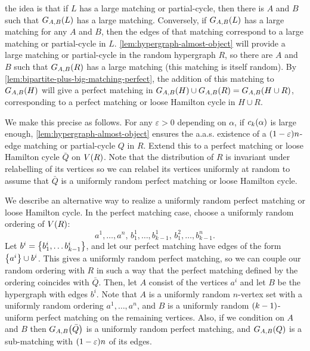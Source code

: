 \documentclass[11pt,english]{article}
\theoremstyle{plain}
\theoremstyle{definition}
\theoremstyle{definition}
\theoremstyle{plain}
\theoremstyle{plain}
\theoremstyle{plain}
\theoremstyle{plain}
\theoremstyle{remark}
\theoremstyle{remark}
\let\originalleft\left
\let\originalright\right
\renewcommand{\left}{\mathopen{}\mathclose\bgroup\originalleft}
\renewcommand{\right}{\aftergroup\egroup\originalright}
\begin{document}
the idea is that if $L$ has a large matching or partial-cycle, then there
is $A$ and $B$ such that $G_{A,B}\left(L\right)$ has a large matching. Conversely,
if $G_{A,B}\left(L\right)$ has a large matching for any $A$
and $B$, then the edges of that matching correspond to a large matching or partial-cycle in $L$. \ref{lem:hypergraph-almost-object}
will provide a large matching or partial-cycle in the random hypergraph $R$, so there are $A$
and $B$ such that $G_{A,B}\left(R\right)$ has a large matching (this matching is itself random).
By \ref{lem:bipartite-plus-big-matching-perfect}, the addition of
this matching to $G_{A,B}\left(H\right)$ will give a perfect
matching in $G_{A,B}\left(H\right)\cup G_{A,B}\left(R\right)=G_{A,B}\left(H\cup R\right)$,
corresponding to a perfect matching or loose Hamilton cycle in $H\cup R$.

We make this precise as follows. For any $\varepsilon>0$ depending on $\alpha$, if $\chyp\left(\alpha\right)$
is large enough, \ref{lem:hypergraph-almost-object} ensures the a.a.s.
existence of a $\left(1-\varepsilon\right)n$-edge matching or partial-cycle $Q$ in $R$. Extend this to a perfect matching or loose Hamilton cycle
$\bar{Q}$ on $V\left(R\right)$. Note that the distribution of $R$
is invariant under relabelling of its vertices so we can relabel its
vertices uniformly at random to assume that $\bar{Q}$ is a uniformly
random perfect matching or loose Hamilton cycle.

We describe an alternative way to realize a uniformly random perfect
matching or loose Hamilton cycle. In the perfect matching case, choose a
uniformly random ordering of $V\left(R\right)$: 
\[
a^{1},\dots,a^{n},\, b_{1}^{1},\dots,b_{k-1}^{1},\, b_{1}^{2},\dots,b_{k-1}^{n}.
\]
Let $b^{i}=\left\{ b_{1}^{i},\dots b_{k-1}^{i}\right\}$, and let our perfect matching have edges of the form $\left\{a^{i}\right\}\cup b^i $.
This gives a uniformly random perfect matching, so we can couple our
random ordering with $R$ in such a way that the perfect matching
defined by the ordering coincides with $\bar{Q}$. Then, let $A$
consist of the vertices $a^{i}$ and let $B$ be the hypergraph with
edges $b^i$.
Note that $A$ is a uniformly random $n$-vertex set with a uniformly random ordering $a^{1},\dots,a^{n}$, and $B$ is a
uniformly random $\left(k-1\right)$-uniform perfect matching on the remaining vertices. Also,
if we condition on $A$ and $B$ then $G_{A,B}\left(\bar{Q}\right)$
is a uniformly random perfect matching, and $G_{A,B}\left(Q\right)$
is a sub-matching with $\left(1-\varepsilon\right)n$ of its edges.
\end{document}
